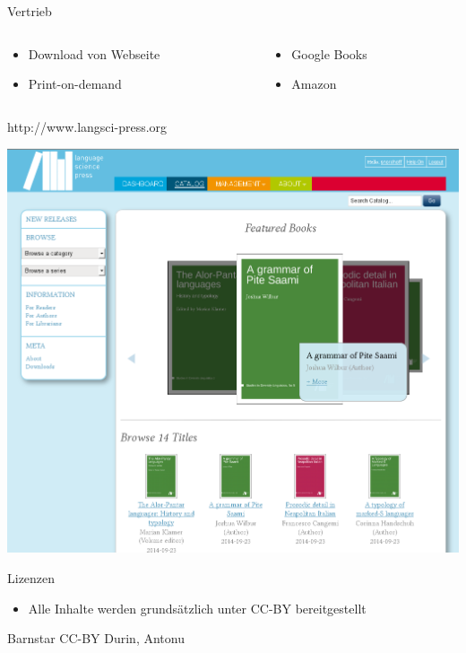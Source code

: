 \documentclass[final]{beamer}
\begin{document}
\begin{frame}{}
\begin{columns}[t]
\begin{column}{.45\linewidth}
    \begin{block}{Vertrieb}
      \begin{columns}
\begin{column}{.48\textwidth}
      \begin{itemize}
      \item Download von Webseite 
      \item Print-on-demand 
      \end{itemize}
\end{column}
\begin{column}{.48\textwidth}
      \begin{itemize}
      \item Google Books 
      \item Amazon
      \end{itemize}
\end{column}
\end{columns}

       
    \end{block}

    \begin{block}{http://www.langsci-press.org}
      \begin{center}
      \includegraphics[width=.8\linewidth]{webseite.png}
       
      \end{center} 
    \end{block}

    \begin{block}{Lizenzen}
      \begin{itemize}
       \item Alle Inhalte werden grunds{\"a}tzlich unter CC-BY bereitgestellt
      \end{itemize}
      {\tiny 
      \item  Barnstar CC-BY Durin, Antonu 
      } 
    \end{block}




\end{column}
\end{columns}
\end{frame}
\end{document}
